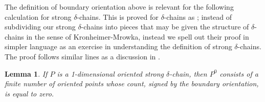 \documentclass{memo-l}
\newtheorem{lemma}[theorem]{Lemma}
\theoremstyle{definition}
\theoremstyle{remark}
\numberwithin{section}{chapter}
\numberwithin{equation}{chapter}
\begin{document}
The definition of boundary orientation above is relevant for the following calculation for strong $\delta$-chains. This is proved for $\delta$-chains as \cite[Theorem~21.3.2]{KMSW}; instead of subdividing our strong $\delta$-chains into pieces that may be given the structure of $\delta$-chains in the sense of Kronheimer-Mrowka, instead we spell out their proof in simpler language as an exercise in understanding the definition of strong $\delta$-chains. The proof follows similar lines as a discussion in \cite[Section~2.3]{SS-Invol}.

\begin{lemma}\label{Stokes}If $P$ is a 1-dimensional oriented strong $\delta$-chain, then $P^0$ consists of a finite number of oriented points whose count, signed by the boundary orientation, is equal to zero.
\end{lemma}
\end{document}
